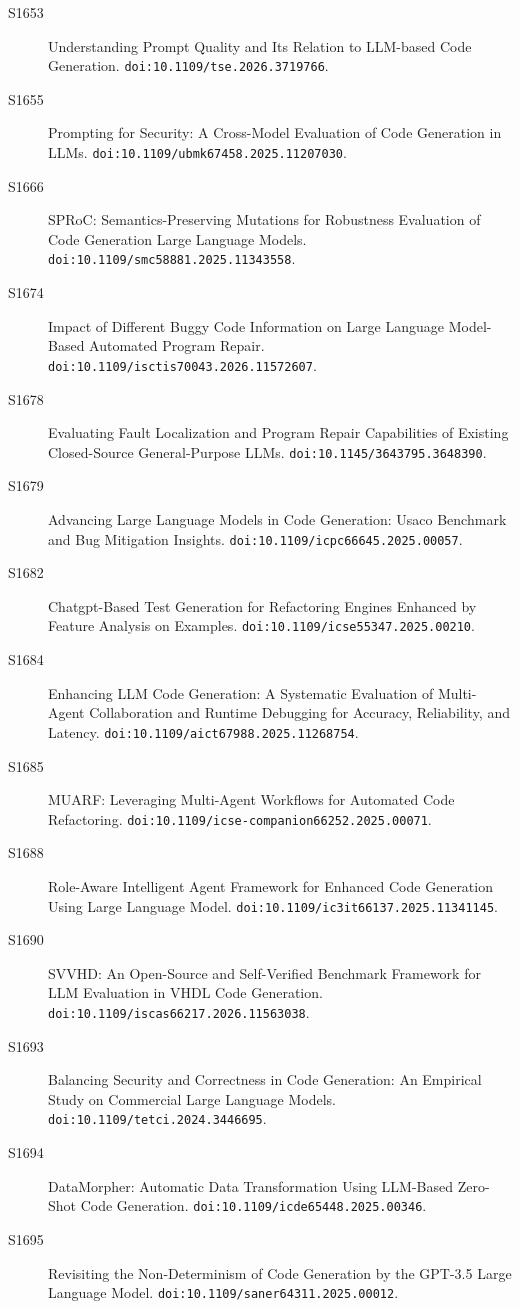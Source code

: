 {\begin{description}
\item[S1653] Understanding Prompt Quality and Its Relation to LLM-based Code Generation. \texttt{doi:10.1109/tse.2026.3719766}.
\item[S1655] Prompting for Security: A Cross-Model Evaluation of Code Generation in LLMs. \texttt{doi:10.1109/ubmk67458.2025.11207030}.
\item[S1666] SPRoC: Semantics-Preserving Mutations for Robustness Evaluation of Code Generation Large Language Models. \texttt{doi:10.1109/smc58881.2025.11343558}.
\item[S1674] Impact of Different Buggy Code Information on Large Language Model-Based Automated Program Repair. \texttt{doi:10.1109/isctis70043.2026.11572607}.
\item[S1678] Evaluating Fault Localization and Program Repair Capabilities of Existing Closed-Source General-Purpose LLMs. \texttt{doi:10.1145/3643795.3648390}.
\item[S1679] Advancing Large Language Models in Code Generation: Usaco Benchmark and Bug Mitigation Insights. \texttt{doi:10.1109/icpc66645.2025.00057}.
\item[S1682] Chatgpt-Based Test Generation for Refactoring Engines Enhanced by Feature Analysis on Examples. \texttt{doi:10.1109/icse55347.2025.00210}.
\item[S1684] Enhancing LLM Code Generation: A Systematic Evaluation of Multi-Agent Collaboration and Runtime Debugging for Accuracy, Reliability, and Latency. \texttt{doi:10.1109/aict67988.2025.11268754}.
\item[S1685] MUARF: Leveraging Multi-Agent Workflows for Automated Code Refactoring. \texttt{doi:10.1109/icse-companion66252.2025.00071}.
\item[S1688] Role-Aware Intelligent Agent Framework for Enhanced Code Generation Using Large Language Model. \texttt{doi:10.1109/ic3it66137.2025.11341145}.
\item[S1690] SVVHD: An Open-Source and Self-Verified Benchmark Framework for LLM Evaluation in VHDL Code Generation. \texttt{doi:10.1109/iscas66217.2026.11563038}.
\item[S1693] Balancing Security and Correctness in Code Generation: An Empirical Study on Commercial Large Language Models. \texttt{doi:10.1109/tetci.2024.3446695}.
\item[S1694] DataMorpher: Automatic Data Transformation Using LLM-Based Zero-Shot Code Generation. \texttt{doi:10.1109/icde65448.2025.00346}.
\item[S1695] Revisiting the Non-Determinism of Code Generation by the GPT-3.5 Large Language Model. \texttt{doi:10.1109/saner64311.2025.00012}.

\end{description}}
